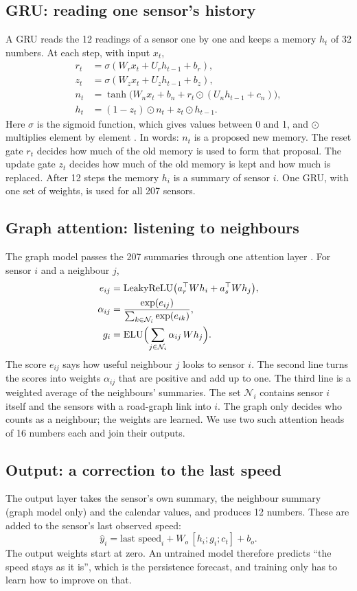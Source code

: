 \documentclass[conference]{IEEEtran}
\begin{document}
\subsection{GRU: reading one sensor's history}
A GRU reads the 12 readings of a sensor one by one and keeps a memory $h_t$ of 32 numbers. At each step, with input $x_t$,
\begin{align}
r_t&=\sigma(W_r x_t+U_r h_{t-1}+b_r),\\
z_t&=\sigma(W_z x_t+U_z h_{t-1}+b_z),\\
n_t&=\tanh\bigl(W_n x_t+b_n+r_t\odot(U_n h_{t-1}+c_n)\bigr),\\
h_t&=(1-z_t)\odot n_t+z_t\odot h_{t-1}.
\end{align}
Here $\sigma$ is the sigmoid function, which gives values between 0 and 1, and $\odot$ multiplies element by element \cite{cho}. In words: $n_t$ is a proposed new memory. The reset gate $r_t$ decides how much of the old memory is used to form that proposal. The update gate $z_t$ decides how much of the old memory is kept and how much is replaced. After 12 steps the memory $h_i$ is a summary of sensor $i$. One GRU, with one set of weights, is used for all 207 sensors.

\subsection{Graph attention: listening to neighbours}
The graph model passes the 207 summaries through one attention layer \cite{gat}. For sensor $i$ and a neighbour $j$,
\begin{align}
e_{ij}&=\operatorname{LeakyReLU}\bigl(a_r^{\top}Wh_i+a_s^{\top}Wh_j\bigr),\\
\alpha_{ij}&=\frac{\exp(e_{ij})}{\sum_{k\in\mathcal N_i}\exp(e_{ik})},\\
g_i&=\operatorname{ELU}\Bigl(\sum_{j\in\mathcal N_i}\alpha_{ij}\,Wh_j\Bigr).
\end{align}
The score $e_{ij}$ says how useful neighbour $j$ looks to sensor $i$. The second line turns the scores into weights $\alpha_{ij}$ that are positive and add up to one. The third line is a weighted average of the neighbours' summaries. The set $\mathcal N_i$ contains sensor $i$ itself and the sensors with a road-graph link into $i$. The graph only decides who counts as a neighbour; the weights are learned. We use two such attention heads of 16 numbers each and join their outputs.

\subsection{Output: a correction to the last speed}
The output layer takes the sensor's own summary, the neighbour summary (graph model only) and the calendar values, and produces 12 numbers. These are added to the sensor's last observed speed:
\begin{equation}
\hat y_{i}=\text{last speed}_i+W_o\,[h_i;g_i;c_t]+b_o .
\end{equation}
The output weights start at zero. An untrained model therefore predicts ``the speed stays as it is'', which is the persistence forecast, and training only has to learn how to improve on that.
\end{document}
